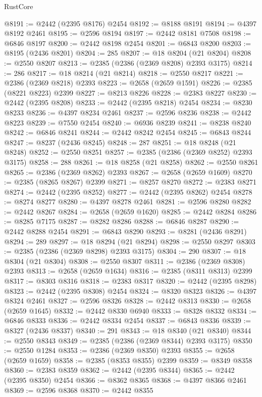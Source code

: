 \begin{lexlean}{RustCore}
\begin{coremodule}
@8191 := @2442 (@2395 @8176) @2454
@8192 := @8188 @8191
@8194 := @4397 @8192 @2461
@8195 := @2596 @8194
@8197 := @2442 @8181 @7508
@8198 := @6846 @8197
@8200 := @2442 @8198 @2454
@8201 := @6843 @8200
@8203 := @8195 (@2436 @8201)
@8204 := 285
@8207 := @18 @8204 (@21 @8204)
@8208 := @2550 @8207
@8213 := @2385 (@2386 (@2369 @8208) @2393 @3175)
@8214 := 286
@8217 := @18 @8214 (@21 @8214)
@8218 := @2550 @8217
@8221 := @2386 (@2369 @8218) @2393
@8223 := @2658 (@2659 @1591)
@8226 := @2385 (@8221 @8223) @2399
@8227 := @8213 @8226
@8228 := @2383 @8227
@8230 := @2442 (@2395 @8208)
@8233 := @2442 (@2395 @8218) @2454
@8234 := @8230 @8233
@8236 := @4397 @8234 @2461
@8237 := @2596 @8236
@8238 := @2442 @8223
@8239 := @7550 @2454
@8240 := @6936 @8239
@8241 := @8238 @8240
@8242 := @6846 @8241
@8244 := @2442 @8242 @2454
@8245 := @6843 @8244
@8247 := @8237 (@2436 @8245)
@8248 := 287
@8251 := @18 @8248 (@21 @8248)
@8252 := @2550 @8251
@8257 := @2385 (@2386 (@2369 @8252) @2393 @3175)
@8258 := 288
@8261 := @18 @8258 (@21 @8258)
@8262 := @2550 @8261
@8265 := @2386 (@2369 @8262) @2393
@8267 := @2658 (@2659 @1609)
@8270 := @2385 (@8265 @8267) @2399
@8271 := @8257 @8270
@8272 := @2383 @8271
@8274 := @2442 (@2395 @8252)
@8277 := @2442 (@2395 @8262) @2454
@8278 := @8274 @8277
@8280 := @4397 @8278 @2461
@8281 := @2596 @8280
@8282 := @2442 @8267
@8284 := @2658 (@2659 @1620)
@8285 := @2442 @8284
@8286 := @8285 @7175
@8287 := @8282 @8286
@8288 := @6846 @8287
@8290 := @2442 @8288 @2454
@8291 := @6843 @8290
@8293 := @8281 (@2436 @8291)
@8294 := 289
@8297 := @18 @8294 (@21 @8294)
@8298 := @2550 @8297
@8303 := @2385 (@2386 (@2369 @8298) @2393 @3175)
@8304 := 290
@8307 := @18 @8304 (@21 @8304)
@8308 := @2550 @8307
@8311 := @2386 (@2369 @8308) @2393
@8313 := @2658 (@2659 @1634)
@8316 := @2385 (@8311 @8313) @2399
@8317 := @8303 @8316
@8318 := @2383 @8317
@8320 := @2442 (@2395 @8298)
@8323 := @2442 (@2395 @8308) @2454
@8324 := @8320 @8323
@8326 := @4397 @8324 @2461
@8327 := @2596 @8326
@8328 := @2442 @8313
@8330 := @2658 (@2659 @1645)
@8332 := @2442 @8330 @6940
@8333 := @8328 @8332
@8334 := @6846 @8333
@8336 := @2442 @8334 @2454
@8337 := @6843 @8336
@8339 := @8327 (@2436 @8337)
@8340 := 291
@8343 := @18 @8340 (@21 @8340)
@8344 := @2550 @8343
@8349 := @2385 (@2386 (@2369 @8344) @2393 @3175)
@8350 := @2550 @1284
@8353 := @2386 (@2369 @8350) @2393
@8355 := @2658 (@2659 @1659)
@8358 := @2385 (@8353 @8355) @2399
@8359 := @8349 @8358
@8360 := @2383 @8359
@8362 := @2442 (@2395 @8344)
@8365 := @2442 (@2395 @8350) @2454
@8366 := @8362 @8365
@8368 := @4397 @8366 @2461
@8369 := @2596 @8368
@8370 := @2442 @8355

\end{coremodule}
\end{lexlean}
